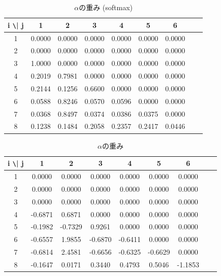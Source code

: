 \documentclass[twocolumn]{jarticle}     %
\begin{document}
\begin{table}[tb]
  \begin{center}
    \caption{$\alpha$の重み (softmax)}
    \begin{tabular}{|c|c|c|c|c|c|c|c|c|} \hline
      i \verb|\| j & 1 & 2 & 3 & 4 & 5 & 6 \\ \hline
      1 & 0.0000 & 0.0000 & 0.0000 & 0.0000 & 0.0000 & 0.0000 \\ \hline
      2 & 0.0000 & 0.0000 & 0.0000 & 0.0000 & 0.0000 & 0.0000 \\ \hline
      3 & 1.0000 & 0.0000 & 0.0000 & 0.0000 & 0.0000 & 0.0000 \\ \hline
      4 & 0.2019 & 0.7981 & 0.0000 & 0.0000 & 0.0000 & 0.0000 \\ \hline
      5 & 0.2144 & 0.1256 & 0.6600 & 0.0000 & 0.0000 & 0.0000 \\ \hline
      6 & 0.0588 & 0.8246 & 0.0570 & 0.0596 & 0.0000 & 0.0000 \\ \hline
      7 & 0.0368 & 0.8497 & 0.0374 & 0.0386 & 0.0375 & 0.0000 \\ \hline
      8 & 0.1238 & 0.1484 & 0.2058 & 0.2357 & 0.2417 & 0.0446 \\ \hline
    \end{tabular}
    \label{tab:alpha_max}
  \end{center}
\end{table}

\begin{table}[tb]
  \begin{center}
    \caption{$\alpha$の重み}
    \begin{tabular}{|c|c|c|c|c|c|c|c|c|} \hline
      i \verb|\| j & 1 & 2 & 3 & 4 & 5 & 6 \\ \hline
      1 & 0.0000 & 0.0000 & 0.0000 & 0.0000 & 0.0000 & 0.0000 \\ \hline
      2 & 0.0000 & 0.0000 & 0.0000 & 0.0000 & 0.0000 & 0.0000 \\ \hline
      3 & 0.0000 & 0.0000 & 0.0000 & 0.0000 & 0.0000 & 0.0000 \\ \hline
      4 & -0.6871 & 0.6871 & 0.0000 & 0.0000 & 0.0000 & 0.0000 \\ \hline
      5 & -0.1982 & -0.7329 & 0.9261 & 0.0000 & 0.0000 & 0.0000 \\ \hline
      6 & -0.6557 & 1.9855 & -0.6870 & -0.6411 & 0.0000 & 0.0000 \\ \hline
      7 & -0.6814 & 2.4581 & -0.6656 & -0.6325 & -0.6629 & 0.0000 \\ \hline
      8 & -0.1647 & 0.0171 & 0.3440 & 0.4793 & 0.5046 & -1.1853 \\ \hline
    \end{tabular}
    \label{tab:alpha}
  \end{center}
\end{table}
\end{document}
